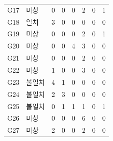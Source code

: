 \begin{longtable}{llrrrrrr}
G17 & 미상 & 0 & 0 & 0 & 2 & 0 & 1 \\
G18 & 일치 & 3 & 0 & 0 & 0 & 0 & 0 \\
G19 & 미상 & 0 & 0 & 0 & 2 & 0 & 1 \\
G20 & 미상 & 0 & 0 & 4 & 3 & 0 & 0 \\
G21 & 미상 & 0 & 0 & 0 & 2 & 0 & 0 \\
G22 & 미상 & 1 & 0 & 0 & 3 & 0 & 0 \\
G23 & 불일치 & 4 & 1 & 0 & 0 & 0 & 0 \\
G24 & 불일치 & 2 & 3 & 0 & 0 & 0 & 0 \\
G25 & 불일치 & 0 & 1 & 1 & 1 & 0 & 1 \\
G26 & 미상 & 0 & 0 & 0 & 6 & 0 & 0 \\
G27 & 미상 & 2 & 0 & 0 & 2 & 0 & 0 \\
\end{longtable}
\endgroup
